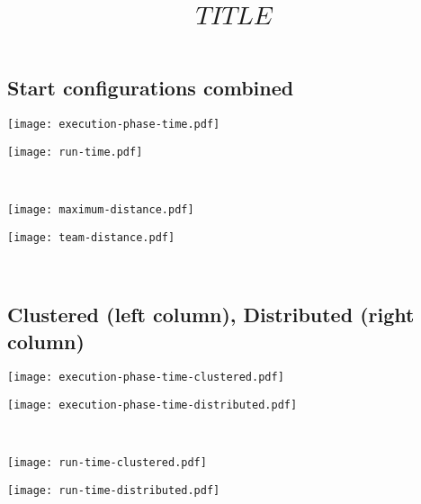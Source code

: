 \documentclass[11pt,a4paper]{article}
\title{$TITLE$}
\author{}
\date{}
\begin{document}
\maketitle

\subsection*{Start configurations combined}

\vspace{1cm}


\noindent
\begin{minipage}{0.5\textwidth}
\texttt{[image: execution-phase-time.pdf]}
\end{minipage}
\begin{minipage}{0.5\textwidth}
\texttt{[image: run-time.pdf]}
\end{minipage}
\\[2.0cm]


\noindent
\begin{minipage}{0.5\textwidth}
\texttt{[image: maximum-distance.pdf]}
\end{minipage}
\begin{minipage}{0.5\textwidth}
\texttt{[image: team-distance.pdf]}
\end{minipage}
\\[0.2cm]

\newpage


\subsection*{Clustered (left column), Distributed (right column)}

\noindent
\begin{minipage}{0.5\textwidth}
\texttt{[image: execution-phase-time-clustered.pdf]}
\end{minipage}
\begin{minipage}{0.5\textwidth}
\texttt{[image: execution-phase-time-distributed.pdf]}
\end{minipage}
\\[0.2cm]

\noindent
\begin{minipage}{0.5\textwidth}
\texttt{[image: run-time-clustered.pdf]}
\end{minipage}
\begin{minipage}{0.5\textwidth}
\texttt{[image: run-time-distributed.pdf]}
\end{minipage}
\\[0.2cm]
\end{document}
